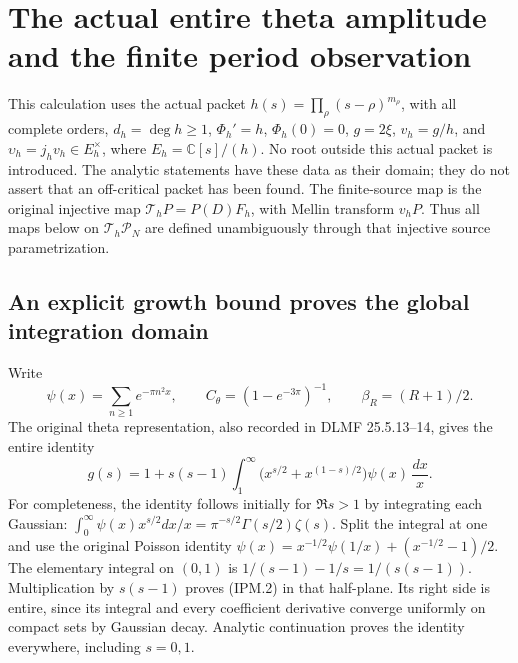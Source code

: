 \section{The actual entire theta amplitude and the finite period observation}
\label{sec:ipm-entire-source}

This calculation uses the actual packet
\(h(s)=\prod_\rho(s-\rho)^{m_\rho}\), with all complete orders,
\(d_h=\deg h\ge1\), \(\Phi_h'=h\), \(\Phi_h(0)=0\),
\(g=2\xi\), \(v_h=g/h\), and
\(\upsilon_h=j_hv_h\in E_h^\times\), where
\(E_h=\mathbb C[s]/(h)\). No root outside this actual packet is
introduced. The analytic statements have these data as their domain;
they do not assert that an off-critical packet has been found.
The finite-source map is the original injective map
\(\mathcal T_hP=P(D)F_h\), with Mellin transform \(v_hP\).
Thus all maps below on \(\mathcal T_h\mathcal P_N\) are defined
unambiguously through that injective source parametrization.

\subsection{An explicit growth bound proves the global integration domain}

Write
\[
 \psi(x)=\sum_{n\ge1}e^{-\pi n^2x},\qquad
 C_\theta=(1-e^{-3\pi})^{-1},\qquad
 \beta_R=(R+1)/2.
 \tag{IPM.1}
\]
The original theta representation, also recorded in DLMF 25.5.13--14,
gives the entire identity
\[
 g(s)=1+s(s-1)\int_1^\infty
       \bigl(x^{s/2}+x^{(1-s)/2}\bigr)\psi(x)\,\frac{dx}{x}.
 \tag{IPM.2}
\]
For completeness, the identity follows initially for \(\Re s>1\)
by integrating each Gaussian:
\(\int_0^\infty\psi(x)x^{s/2}dx/x
=\pi^{-s/2}\Gamma(s/2)\zeta(s)\).
Split the integral at one and use the original Poisson identity
\(\psi(x)=x^{-1/2}\psi(1/x)+(x^{-1/2}-1)/2\).
The elementary integral on \((0,1)\) is
\(1/(s-1)-1/s=1/(s(s-1))\). Multiplication by \(s(s-1)\)
proves (IPM.2) in that half-plane. Its right side is entire, since its
integral and every coefficient derivative converge uniformly on compact
sets by Gaussian decay. Analytic continuation proves the identity
everywhere, including \(s=0,1\).

